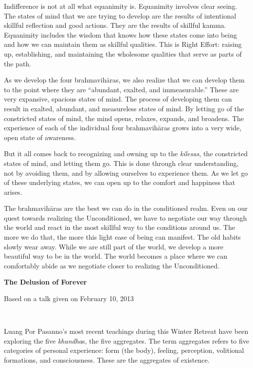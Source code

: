 Indifference is not at all what equanimity is. Equanimity involves clear seeing. The states of mind that we are trying to develop are the results of intentional skillful reflection and good actions. They are the results of skillful kamma. Equanimity includes the wisdom that knows how these states come into being and how we can maintain them as skillful qualities. This is Right Effort: raising up, establishing, and maintaining the wholesome qualities that serve as parts of the path.

As we develop the four brahmavihāras, we also realize that we can develop them to the point where they are ``abundant, exalted, and immeasurable.'' These are very expansive, spacious states of mind. The process of developing them can result in exalted, abundant, and measureless states of mind. By letting go of the constricted states of mind, the mind opens, relaxes, expands, and broadens. The experience of each of the individual four brahmavihāras grows into a very wide, open state of awareness.

But it all comes back to recognizing and owning up to the \emph{kilesas}, the constricted states of mind, and letting them go. This is done through clear understanding, not by avoiding them, and by allowing ourselves to experience them. As we let go of these underlying states, we can open up to the comfort and happiness that arises.

The brahmavihāras are the best we can do in the conditioned realm. Even on our quest towards realizing the Unconditioned, we have to negotiate our way through the world and react in the most skillful way to the conditions around us. The more we do that, the more this light ease of being can manifest. The old habits slowly wear away. While we are still part of the world, we develop a more beautiful way to be in the world. The world becomes a place where we can comfortably abide as we negotiate closer to realizing the Unconditioned.

\textbf{The Delusion of Forever}~

Based on a talk given on February 10, 2013~

~

Luang Por Pasanno's most recent teachings during this Winter Retreat have been exploring the five \emph{khandha}s, the five aggregates. The term aggregates refers to five categories of personal experience: form (the body), feeling, perception, volitional formations, and consciousness. These are the aggregates of existence.~~

~

